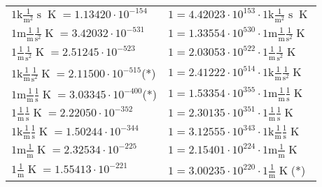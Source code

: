 \begin{center}
\begin{longtable}{l l}
{\color{gray}$1 \bm{\mathrm{ k}}\frac1{\operatorname{m}^2}{\operatorname{s}}{}{\operatorname{K}} = 1.13420\cdot10^{-154} $}   & {\color{gray}$ 1 = 4.42023\cdot10^{153} \cdot 1 \bm{\mathrm{ k}}\frac1{\operatorname{m}^2}{\operatorname{s}}{}{\operatorname{K}}$}  \\
{\color{gray}$1 \bm{\mathrm{ m}}\frac1{\operatorname{m}}\frac1{\operatorname{s}^2}{}{\operatorname{K}} = 3.42032\cdot10^{-531} $}   & {\color{gray}$ 1 = 1.33554\cdot10^{530} \cdot 1 \bm{\mathrm{ m}}\frac1{\operatorname{m}}\frac1{\operatorname{s}^2}{}{\operatorname{K}}$}  \\
{\color{black}$1 \bm{\mathrm{ }}\frac1{\operatorname{m}}\frac1{\operatorname{s}^2}{}{\operatorname{K}} = 2.51245\cdot10^{-523} $}   & {\color{black}$ 1 = 2.03053\cdot10^{522} \cdot 1 \bm{\mathrm{ }}\frac1{\operatorname{m}}\frac1{\operatorname{s}^2}{}{\operatorname{K}}$}  \\
{\color{gray}$1 \bm{\mathrm{ k}}\frac1{\operatorname{m}}\frac1{\operatorname{s}^2}{}{\operatorname{K}} = 2.11500\cdot10^{-515} $}\quad(*) & {\color{gray}$ 1 = 2.41222\cdot10^{514} \cdot 1 \bm{\mathrm{ k}}\frac1{\operatorname{m}}\frac1{\operatorname{s}^2}{}{\operatorname{K}}$}  \\
{\color{gray}$1 \bm{\mathrm{ m}}\frac1{\operatorname{m}}\frac1{\operatorname{s}}{}{\operatorname{K}} = 3.03345\cdot10^{-400} $}\quad(*) & {\color{gray}$ 1 = 1.53354\cdot10^{355} \cdot 1 \bm{\mathrm{ m}}\frac1{\operatorname{m}}\frac1{\operatorname{s}}{}{\operatorname{K}}$}  \\
{\color{black}$1 \bm{\mathrm{ }}\frac1{\operatorname{m}}\frac1{\operatorname{s}}{}{\operatorname{K}} = 2.22050\cdot10^{-352} $}   & {\color{black}$ 1 = 2.30135\cdot10^{351} \cdot 1 \bm{\mathrm{ }}\frac1{\operatorname{m}}\frac1{\operatorname{s}}{}{\operatorname{K}}$}  \\
{\color{gray}$1 \bm{\mathrm{ k}}\frac1{\operatorname{m}}\frac1{\operatorname{s}}{}{\operatorname{K}} = 1.50244\cdot10^{-344} $}   & {\color{gray}$ 1 = 3.12555\cdot10^{343} \cdot 1 \bm{\mathrm{ k}}\frac1{\operatorname{m}}\frac1{\operatorname{s}}{}{\operatorname{K}}$}  \\
{\color{gray}$1 \bm{\mathrm{ m}}\frac1{\operatorname{m}}{}{}{\operatorname{K}} = 2.32534\cdot10^{-225} $}   & {\color{gray}$ 1 = 2.15401\cdot10^{224} \cdot 1 \bm{\mathrm{ m}}\frac1{\operatorname{m}}{}{}{\operatorname{K}}$}  \\
{\color{black}$1 \bm{\mathrm{ }}\frac1{\operatorname{m}}{}{}{\operatorname{K}} = 1.55413\cdot10^{-221} $}   & {\color{black}$ 1 = 3.00235\cdot10^{220} \cdot 1 \bm{\mathrm{ }}\frac1{\operatorname{m}}{}{}{\operatorname{K}}$}\quad(*)\\

\end{longtable}
\end{center}
